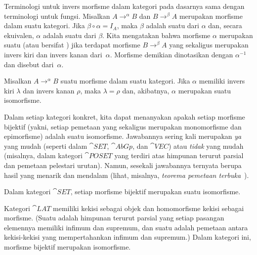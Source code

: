 \begin{defn} Terminologi untuk invers morfisme dalam kategori pada dasarnya sama
dengan terminologi untuk fungsi. Misalkan $A \to^\alpha B$ dan $B \to^\beta A$ merupakan
morfisme dalam suatu kategori. Jika $\beta \circ \alpha = I_A$, maka $\beta$ adalah suatu
 dari $\alpha$ dan, secara ekuivalen, $\alpha$ adalah suatu
 dari $\beta$. Kita mengatakan bahwa morfisme $\alpha$ merupakan suatu
 (atau bersifat
) jika terdapat morfisme $B \to^\beta A$ yang sekaligus merupakan invers kiri dan
invers kanan dari~$\alpha$. Morfisme demikian dinotasikan dengan $\alpha^{-1}$ dan disebut
 dari~$\alpha$.
\end{defn}

\begin{prop} Misalkan $A \to^\alpha B$ suatu morfisme dalam suatu kategori. Jika $\alpha$ memiliki invers kiri $\lambda$ dan
invers kanan $\rho$, maka $\lambda = \rho$ dan, akibatnya, $\alpha$ merupakan suatu isomorfisme.
\end{prop}

Dalam setiap kategori konkret, kita dapat menanyakan apakah setiap morfisme bijektif (yakni, setiap
pemetaan yang sekaligus merupakan monomorfisme dan epimorfisme) adalah suatu isomorfisme. Jawabannya
sering kali merupakan \emph{ya} yang mudah (seperti dalam $\cat{SET}$, $\cat{AbGp}$, dan $\cat{VEC}$) atau
\emph{tidak} yang mudah (misalnya, dalam kategori $\cat{POSET}$
yang terdiri atas himpunan terurut parsial dan pemetaan pelestari urutan). Namun,
sesekali jawabannya ternyata berupa hasil yang menarik dan mendalam (lihat, misalnya, \emph{teorema pemetaan
terbuka}~).

\begin{exam} Dalam kategori $\cat{SET}$,
setiap morfisme bijektif merupakan suatu isomorfisme.
\end{exam}

\begin{exam}\label{C015216} Kategori
$\cat{LAT}$ memiliki kekisi sebagai objek dan homomorfisme
kekisi sebagai morfisme. (Suatu
 adalah himpunan terurut parsial yang setiap pasangan elemennya memiliki infimum dan supremum, dan suatu
 adalah pemetaan antara kekisi-kekisi yang mempertahankan infimum dan supremum.)
Dalam kategori ini, morfisme bijektif
merupakan isomorfisme.
\end{exam}

